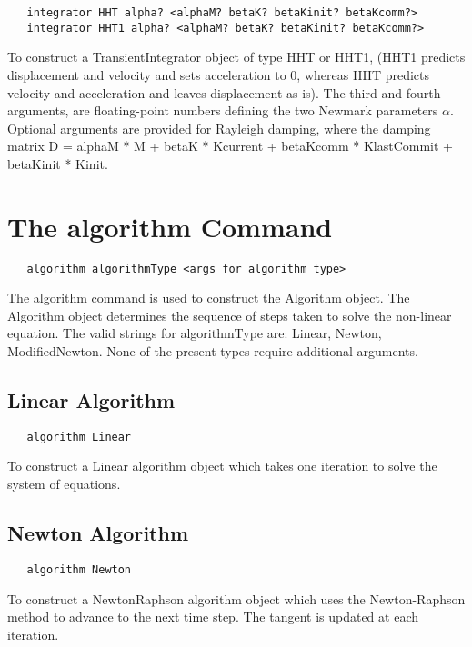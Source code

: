 \documentclass[12pt]{article}
\begin{document}
{\sf\small
\begin{verbatim}
   integrator HHT alpha? <alphaM? betaK? betaKinit? betaKcomm?> 
   integrator HHT1 alpha? <alphaM? betaK? betaKinit? betaKcomm?> 
\end{verbatim}
}

To construct a TransientIntegrator object of type HHT or HHT1,
(HHT1 predicts displacement and velocity and sets acceleration to
$0$, whereas HHT predicts velocity and acceleration and leaves
displacement as is). The third and fourth arguments, are
floating-point numbers defining the two Newmark parameters
$\alpha$. Optional arguments are provided for Rayleigh damping, where
the damping matrix D = alphaM * M + betaK * Kcurrent + betaKcomm *
KlastCommit + betaKinit * Kinit.

\section {The algorithm Command}
{\sf\small
\begin{verbatim}
   algorithm algorithmType <args for algorithm type>
\end{verbatim}
}

The algorithm command is used to construct the Algorithm
object. The Algorithm object determines the sequence of steps taken
to solve the non-linear equation. The valid strings for algorithmType
are: Linear, Newton, ModifiedNewton. None of the present types
require additional arguments.

\subsection {Linear Algorithm}
{\sf\small
\begin{verbatim}
   algorithm Linear
\end{verbatim}
}

To construct a Linear algorithm object which takes one iteration to solve
the system of equations.

\subsection {Newton Algorithm}
{\sf\small
\begin{verbatim}
   algorithm Newton
\end{verbatim}
}

To construct a NewtonRaphson algorithm object which uses the Newton-Raphson
method to advance to the next time step. The tangent is updated at
each iteration.
\end{document}
